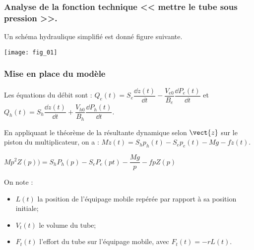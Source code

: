 \normalfalse \difficiletrue \tdifficilefalse
\correctionfalse


\setcounter{question}{0}%
\ifcorrection
\else
{}
\fi

\ifprof
\else

\subsubsection*{Analyse de la fonction technique << mettre le tube sous pression >>.}

Un schéma hydraulique simplifié est donné figure suivante.
\begin{marginfigure}
\texttt{[image: fig\_01]}

\end{marginfigure}


\subsubsection*{Mise en place du modèle}

Les équations du débit sont : 
$Q_e(t)=S_e\dfrac{\dd z(t)}{\dd t} - \dfrac{V_{e0}}{B_e}\dfrac{\dd P_e(t)}{\dd t}$ et 
$Q_h(t)=S_h\dfrac{\dd z(t)}{\dd t} + \dfrac{V_{h0}}{B_h}\dfrac{\dd P_h(t)}{\dd t}.$

En appliquant le théorème de la résultante dynamique selon $\vect{z}$ sur le piston du multiplicateur, on a : 
$
M\ddot{z}(t)=S_hp_h(t)-S_ep_e(t)-Mg-f\dot{z}(t).
$

\fi
{}
\ifprof

$Mp^2 Z(p))=S_hP_h(p)-S_eP_e(pt)-\dfrac{Mg}{p}-fpZ(p)$

\else
\fi


\ifprof
\else
On note :
\begin{itemize}
	\item $L(t)$ la position de l’équipage mobile repérée par rapport à sa position initiale;
	\item $V_t(t)$ le volume du tube;
	\item $F_t(t)$ l’effort du tube sur l’équipage mobile, avec $F_t(t) = - rL(t)$.
\end{itemize}

